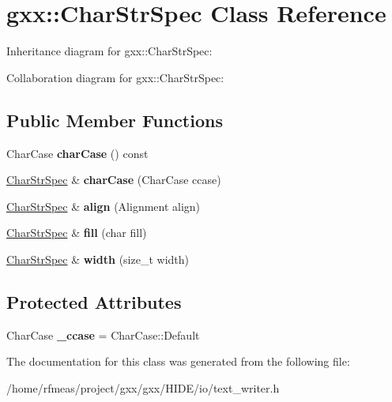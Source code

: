 \hypertarget{classgxx_1_1CharStrSpec}{}\section{gxx\+:\+:Char\+Str\+Spec Class Reference}
\label{classgxx_1_1CharStrSpec}


Inheritance diagram for gxx\+:\+:Char\+Str\+Spec\+:


Collaboration diagram for gxx\+:\+:Char\+Str\+Spec\+:
\subsection*{Public Member Functions}
\begin{DoxyCompactItemize}
\item 
Char\+Case {\bfseries char\+Case} () const \hypertarget{classgxx_1_1CharStrSpec_a1dc341eb44cbe131c1359d8250db5b22}{}\label{classgxx_1_1CharStrSpec_a1dc341eb44cbe131c1359d8250db5b22}

\item 
\hyperlink{classgxx_1_1CharStrSpec}{Char\+Str\+Spec} \& {\bfseries char\+Case} (Char\+Case ccase)\hypertarget{classgxx_1_1CharStrSpec_a20049f3f82f482bb85160a6d1158714d}{}\label{classgxx_1_1CharStrSpec_a20049f3f82f482bb85160a6d1158714d}

\item 
\hyperlink{classgxx_1_1CharStrSpec}{Char\+Str\+Spec} \& {\bfseries align} (Alignment align)\hypertarget{classgxx_1_1CharStrSpec_a99e021803ace781163acad2b6bd9efd5}{}\label{classgxx_1_1CharStrSpec_a99e021803ace781163acad2b6bd9efd5}

\item 
\hyperlink{classgxx_1_1CharStrSpec}{Char\+Str\+Spec} \& {\bfseries fill} (char fill)\hypertarget{classgxx_1_1CharStrSpec_af6ded10729691615ca0f869af442e1d4}{}\label{classgxx_1_1CharStrSpec_af6ded10729691615ca0f869af442e1d4}

\item 
\hyperlink{classgxx_1_1CharStrSpec}{Char\+Str\+Spec} \& {\bfseries width} (size\+\_\+t width)\hypertarget{classgxx_1_1CharStrSpec_ab53ac51ccdba3528c7d7ac1872974011}{}\label{classgxx_1_1CharStrSpec_ab53ac51ccdba3528c7d7ac1872974011}

\end{DoxyCompactItemize}
\subsection*{Protected Attributes}
\begin{DoxyCompactItemize}
\item 
Char\+Case {\bfseries \+\_\+ccase} = Char\+Case\+::\+Default\hypertarget{classgxx_1_1CharStrSpec_a1dc900c599fa48930a12eade5984c182}{}\label{classgxx_1_1CharStrSpec_a1dc900c599fa48930a12eade5984c182}

\end{DoxyCompactItemize}


The documentation for this class was generated from the following file\+:\begin{DoxyCompactItemize}
\item 
/home/rfmeas/project/gxx/gxx/\+H\+I\+D\+E/io/text\+\_\+writer.\+h\end{DoxyCompactItemize}
